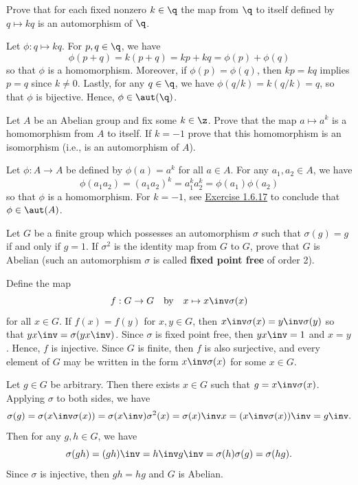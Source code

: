 \begin{exercise} \label{ex1.6.21}
    Prove that for each fixed nonzero $k \in \q$ the map from $\q$ to itself defined by $q \mapsto kq$ is an automorphism of $\q$.
\end{exercise}

\begin{sol}
    Let $\phi : q \mapsto kq$. For $p, q \in \q$, we have
    \[\phi(p + q) = k(p + q) = kp + kq = \phi(p) + \phi(q)\]
    so that $\phi$ is a homomorphism. Moreover, if $\phi(p) = \phi(q)$, then $kp = kq$ implies $p = q$ since $k \neq 0$. Lastly, for any $q \in \q$, we have $\phi(q/k) = k(q/k) = q$, so that $\phi$ is bijective. Hence, $\phi \in \aut(\q)$.
\end{sol}

\begin{exercise}\label{ex1.6.22}
    Let $A$ be an Abelian group and fix some $k \in \z$. Prove that the map $a \mapsto a^k$ is a homomorphism from $A$ to itself. If $k = -1$ prove that this homomorphism is an isomorphism (i.e., is an automorphism of $A$).
\end{exercise}

\begin{sol}
    Let $\phi : A \to A$ be defined by $\phi(a) = a^k$ for all $a \in A$. For any $a_1, a_2 \in A$, we have
    \[\phi(a_1a_2) = (a_1a_2)^k = a_1^k a_2^k = \phi(a_1)\phi(a_2)\]
    so that $\phi$ is a homomorphism. For $k = -1$, see \hyperref[ex1.6.17]{Exercise 1.6.17} to conclude that $\phi \in \aut(A)$.
\end{sol}

\begin{exercise}\label{ex1.6.23}
    Let $G$ be a finite group which possesses an automorphism $\sigma$ such that $\sigma(g) = g$ if and only if $g = 1$. If $\sigma^2$ is the identity map from $G$ to $G$, prove that $G$ is Abelian (such an automorphism $\sigma$ is called \textbf{fixed point free} of order 2).

\end{exercise}

\begin{sol}
    Define the map
    \[f : G \to G \quad \text{by} \quad x \mapsto x\inv \sigma(x)\]
    for all $x \in G$. If $f(x) = f(y)$ for $x, y \in G$, then $x\inv \sigma(x) = y\inv \sigma(y)$ so that $yx\inv = \sigma(yx\inv)$. Since $\sigma$ is fixed point free, then $yx\inv = 1$ and $x = y$. Hence, $f$ is injective. Since $G$ is finite, then $f$ is also surjective, and every element of $G$ may be written in the form $x\inv \sigma(x)$ for some $x \in G$.

    Let $g \in G$ be arbitrary. Then there exists $x \in G$ such that $g = x\inv \sigma(x)$. Applying $\sigma$ to both sides, we have
    \[\sigma(g) = \sigma(x\inv \sigma(x)) = \sigma(x\inv) \sigma^2(x) = \sigma(x)\inv x = (x\inv \sigma(x))\inv = g\inv.\]
    Then for any $g, h \in G$, we have
    \[\sigma(gh) = (gh)\inv = h\inv g\inv = \sigma(h) \sigma(g) = \sigma(hg).\]
    Since $\sigma$ is injective, then $gh = hg$ and $G$ is Abelian.
\end{sol}

